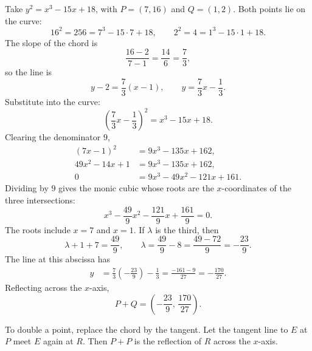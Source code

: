 \par
\ifdim\dimexpr\pagegoal-\pagetotal<5\baselineskip
  \newpage
\fi
\begin{example}
\label{ex:pq-sum}
Take $y^2=x^3-15x+18$, with $P=(7,16)$ and $Q=(1,2)$. Both points lie on the curve:
\[
    16^2=256=7^3-15\cdot 7+18,
    \qquad
    2^2=4=1^3-15\cdot 1+18.
\]
The slope of the chord is
\[
    \frac{16-2}{7-1}=\frac{14}{6}=\frac{7}{3},
\]
so the line is
\[
    y-2=\frac{7}{3}(x-1),
    \qquad
    y=\frac{7}{3}x-\frac{1}{3}.
\]
Substitute into the curve:
\[
    \left(\frac{7}{3}x-\frac{1}{3}\right)^2=x^3-15x+18.
\]
Clearing the denominator $9$,
\begin{align*}
    (7x-1)^2&=9x^3-135x+162,\\
    49x^2-14x+1&=9x^3-135x+162,\\
    0&=9x^3-49x^2-121x+161.
\end{align*}
Dividing by $9$ gives the monic cubic whose roots are the $x$-coordinates of the three intersections:
\begin{equation}
    x^3-\frac{49}{9}x^2-\frac{121}{9}x+\frac{161}{9}=0.
    \label{eq:pq-cubic}
\end{equation}
The roots include $x=7$ and $x=1$. If $\lambda$ is the third, then
\[
    \lambda+1+7=\frac{49}{9},
    \qquad
    \lambda=\frac{49}{9}-8=\frac{49-72}{9}=-\frac{23}{9}.
\]
The line at this abscissa has
\begin{align*}
    y
    &=\frac{7}{3}\left(-\frac{23}{9}\right)-\frac{1}{3}
     =\frac{-161-9}{27}
     =-\frac{170}{27}.
\end{align*}
Reflecting across the $x$-axis,
\[
    P+Q=\left(-\frac{23}{9},\,\frac{170}{27}\right).
\]
\end{example}


To double a point, replace the chord by the tangent. Let the tangent line to $E$ at $P$ meet $E$ again at $R$. Then $P+P$ is the reflection of $R$ across the $x$-axis.


